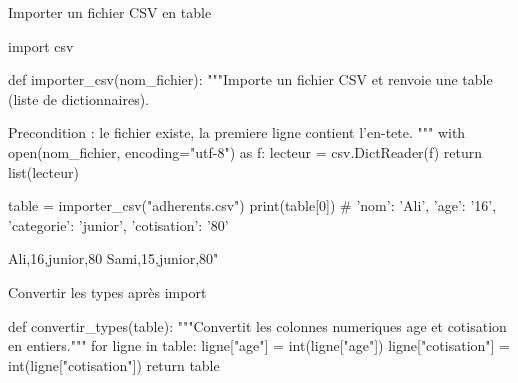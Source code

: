 \begin{codereference}{Importer un fichier CSV en table}
\begin{python}
import csv

def importer_csv(nom_fichier):
    """Importe un fichier CSV et renvoie une table (liste de dictionnaires).

    Precondition : le fichier existe, la premiere ligne contient l'en-tete.
    """
    with open(nom_fichier, encoding="utf-8") as f:
        lecteur = csv.DictReader(f)
        return list(lecteur)

table = importer_csv("adherents.csv")
print(table[0])  # {'nom': 'Ali', 'age': '16', 'categorie': 'junior', 'cotisation': '80'}
\end{python}
\end{codereference}

Ali,16,junior,80
Sami,15,junior,80"


\begin{codereference}{Convertir les types après import}
\begin{python}
def convertir_types(table):
    """Convertit les colonnes numeriques age et cotisation en entiers."""
    for ligne in table:
        ligne["age"] = int(ligne["age"])
        ligne["cotisation"] = int(ligne["cotisation"])
    return table
\end{python}
\end{codereference}


